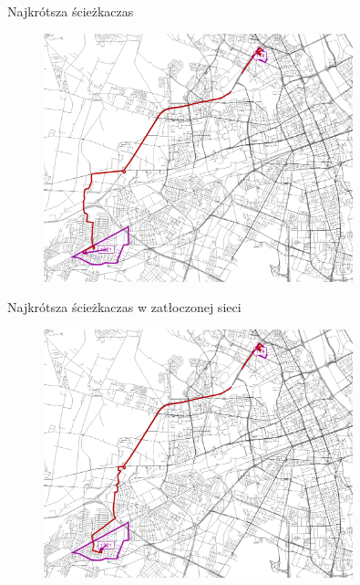 \documentclass[8pt]{beamer}
\begin{document}
\begin{frame}{Najkrótsza ścieżka}{czas}
\begin{figure}\begin{center}
\includegraphics[width=0.8\textwidth]{path_time}
 \end{center}  \end{figure} 
\end{frame}

\begin{frame}{Najkrótsza ścieżka}{czas w zatłoczonej sieci}
\begin{figure}\begin{center}
\includegraphics[width=0.8\textwidth]{path_jam}
 \end{center}  \end{figure} 
\end{frame}
\end{document}
